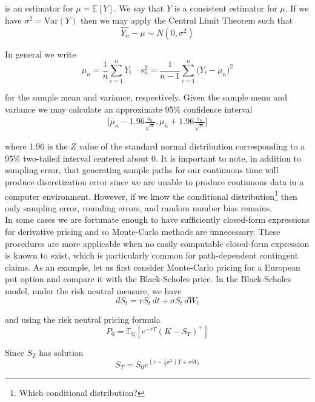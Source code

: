 \documentclass[12pt]{article}
\newlength\tindent
\renewcommand{\indent}{\hspace*{\tindent}}
\begin{document}
is an estimator for $\mu = \mathbb E[Y]$. We say that $\hat{Y}$ is a consistent estimator for $\mu$. If we have $\sigma^2 = \mathrm{Var}(Y)$ then we may apply the Central Limit Theorem such that
\begin{equation*}
	\hat{Y_n} - \mu \sim N(0,\sigma^2)
\end{equation*}

In general we write
\begin{equation*}
	\mu_n = \frac{1}{n}\sum^n_{i=1} Y_i \quad s^2_n = \frac{1}{n-1}\sum^n_{i=1} \big(Y_i - \mu_n \big)^2
\end{equation*}

for the sample mean and variance, respectively. Given the sample mean and variance we may calculate an approximate 95\% confidence interval
\begin{align*}
	\big[\mu_n - 1.96\frac{s_n}{\sqrt{n}}, \mu_n + 1.96\frac{s_n}{\sqrt{n}}\big]
\end{align*}

where 1.96 is the $Z$ value of the standard normal distribution corresponding to a 95\% two-tailed interval centered about 0. It is important to note, in addition to sampling error, that generating sample paths for our continuous time will produce discretization error since we are unable to produce continuous data in a computer environment. However, if we know the conditional distribution\footnote{Which conditional distribution?} then only sampling error, rounding errors, and random number bias remains. \\

\indent In some cases we are fortunate enough to have sufficiently closed-form expressions  for derivative pricing and so Monte-Carlo methods are unnecessary. These procedures are more applicable when no easily computable closed-form expression is known to exist, which is particularly common for path-dependent contingent claims. As an example, let us first consider Monte-Carlo pricing for a European put option and compare it with the Black-Scholes price. In the Black-Scholes model, under the risk neutral measure, we have
\begin{equation*}
	dS_t = rS_t\,dt + \sigma S_t\,dW_t
\end{equation*}

and using the risk neutral pricing formula
\begin{equation*}
	P_0 = \mathbb E_{\mathbb Q}[e^{-rT}(K - S_T)^+]
\end{equation*}

Since $S_T$ has solution
\begin{equation*}
	S_T = S_0e^{(r - \frac{1}{2}\sigma^2)T + \sigma W_t}
\end{equation*}
\end{document}
